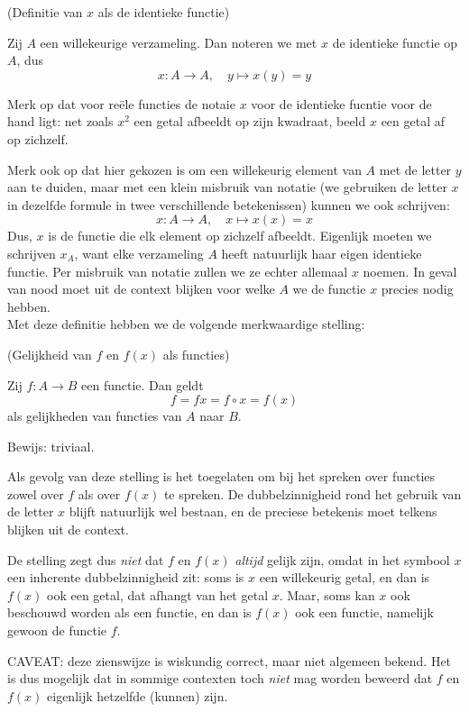 \documentclass{ximera}
\begin{document}
\begin{uitweiding}
\begin{expandable}
\begin{definition} (Definitie van $x$ als de identieke functie)
    
    Zij $A$ een willekeurige verzameling. Dan noteren we met $x$ de identieke functie op $A$, dus
    $$
    x:A \to A,\quad y \mapsto x(y) = y
    $$
\end{definition}
Merk op dat voor reële functies de notaie $x$ voor de identieke fucntie voor de hand ligt: net zoals $x^2$ een getal afbeeldt op zijn kwadraat, beeld $x$ een getal af op zichzelf.

Merk ook op dat hier gekozen is om een willekeurig element van $A$ met de letter $y$ aan te duiden, maar met een klein misbruik van notatie (we gebruiken de letter $x$ in dezelfde formule in twee verschillende betekenissen) kunnen we ook schrijven:
$$
    x:A \to A,\quad x \mapsto x(x) = x
$$
Dus, $x$ is de functie die elk element op zichzelf afbeeldt. Eigenlijk moeten we schrijven $x_A$, want elke verzameling $A$ heeft natuurlijk haar eigen identieke functie. Per misbruik van notatie zullen we ze echter allemaal $x$ noemen. In geval van nood moet uit de context blijken voor welke $A$ we de functie $x$ precies nodig hebben.
\\

Met deze definitie hebben we de volgende merkwaardige stelling:
\begin{proposition} (Gelijkheid van $f$ en $f(x)$ als functies)
    
    Zij $f:A\to B$ een functie. Dan geldt    
    $$
    f = fx = f\circ x = f(x)
    $$
    als gelijkheden van functies van $A$ naar $B$.
\end{proposition}
Bewijs: triviaal.

Als gevolg van deze stelling is het toegelaten om bij het spreken over functies zowel over $f$ als over $f(x)$ te spreken. De dubbelzinnigheid rond het gebruik van de letter $x$ blijft natuurlijk wel bestaan, en de preciese betekenis moet telkens blijken uit de context. 

De stelling zegt dus \textit{niet} dat $f$ en $f(x)$ \textit{altijd} gelijk zijn, omdat in het symbool $x$ een inherente dubbelzinnigheid zit: soms is $x$ een willekeurig getal, en dan is $f(x)$ ook een getal, dat afhangt van het getal $x$. Maar, soms kan $x$ ook beschouwd worden als een functie, en dan is $f(x)$ ook een functie, namelijk gewoon de functie $f$.

CAVEAT: deze zienswijze is wiskundig correct, maar niet algemeen bekend. Het is dus mogelijk dat in sommige contexten toch \textit{niet} mag worden beweerd dat $f$ en $f(x)$ eigenlijk hetzelfde (kunnen) zijn.

\end{expandable}

\end{uitweiding}
\end{document}
